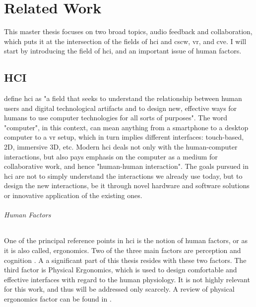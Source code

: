 
\chapter{Related Work}
This master thesis focuses on two broad topics, audio feedback and collaboration, which puts it at the intersection of the fields of \gls{hci} and \gls{cscw}, \gls{vr}, and \gls{cve}. I will start by introducing the field of \gls{hci}, and an important issue of human factors.

\section{HCI}
\parencite[Chapter~4.1.1]{jr_3d_2017} define \gls{hci} as "a field that seeks to understand the relationship between human users and digital technological artifacts and to design new, effective ways for humans to use computer technologies for all sorts of purposes". The word "computer", in this context, can mean anything from a smartphone to a desktop computer to a \gls{vr} setup, which in turn implies different interfaces: touch-based, 2D, immersive 3D, etc. Modern \gls{hci} deals not only with the human-computer interactions, but also pays emphasis on the computer as a medium for collaborative work, and hence "human-human interaction". The goals pursued in \gls{hci} are not to simply understand the interactions we already use today, but to design the new interactions, be it through novel hardware and software solutions or innovative application of the existing ones. 

\subparagraph{Human Factors}
One of the principal reference points in \gls{hci} is the notion of human factors, or as it is also called, ergonomics. Two of the three main factors are perception and cognition \parencite{jr_3d_2017}. A a significant part of this thesis resides with these two factors. The third factor is Physical Ergonomics, which is used to design comfortable and effective interfaces with regard to the human physiology. It is not highly relevant for this work, and thus will be addressed only scarcely. A review of physical ergonomics factor can be found in \parencite[Chapter~3.5]{jr_3d_2017}.

